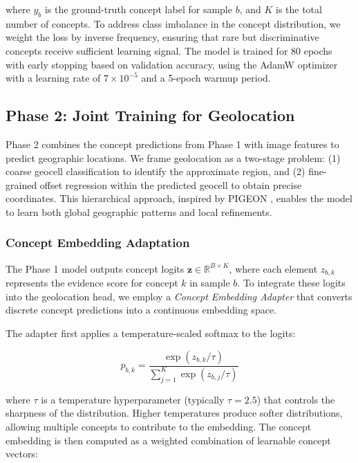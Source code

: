 \documentclass{article}
\begin{document}
where $y_b$ is the ground-truth concept label for sample $b$, and $K$ is the total number of concepts. To address class imbalance in the concept distribution, we weight the loss by inverse frequency, ensuring that rare but discriminative concepts receive sufficient learning signal. The model is trained for 80 epochs with early stopping based on validation accuracy, using the AdamW optimizer with a learning rate of $7 \times 10^{-5}$ and a 5-epoch warmup period.

\subsection{Phase 2: Joint Training for Geolocation}

Phase 2 combines the concept predictions from Phase 1 with image features to predict geographic locations. We frame geolocation as a two-stage problem: (1) coarse geocell classification to identify the approximate region, and (2) fine-grained offset regression within the predicted geocell to obtain precise coordinates. This hierarchical approach, inspired by PIGEON \cite{haas2024pigeonpredictingimagegeolocations}, enables the model to learn both global geographic patterns and local refinements.

\subsubsection{Concept Embedding Adaptation}

The Phase 1 model outputs concept logits $\mathbf{z} \in \mathbb{R}^{B \times K}$, where each element $z_{b,k}$ represents the evidence score for concept $k$ in sample $b$. To integrate these logits into the geolocation head, we employ a \textit{Concept Embedding Adapter} that converts discrete concept predictions into a continuous embedding space.

The adapter first applies a temperature-scaled softmax to the logits:

\begin{equation}
p_{b,k} = \frac{\exp(z_{b,k} / \tau)}{\sum_{j=1}^{K} \exp(z_{b,j} / \tau)}
\end{equation}

where $\tau$ is a temperature hyperparameter (typically $\tau = 2.5$) that controls the sharpness of the distribution. Higher temperatures produce softer distributions, allowing multiple concepts to contribute to the embedding. The concept embedding is then computed as a weighted combination of learnable concept vectors:
\end{document}
